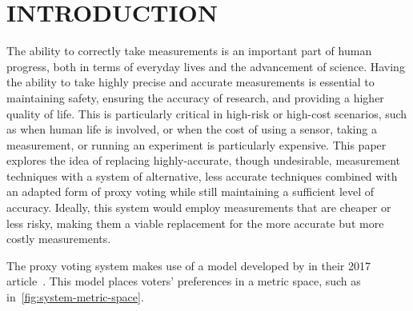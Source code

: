 %
%

\chapter{INTRODUCTION}\label{ch:introduction}
\thispagestyle{empty}

The ability to correctly take measurements is an important part of human
progress, both in terms of everyday lives and the advancement of science.
Having the ability to take highly precise and accurate measurements is essential
to maintaining safety, ensuring the accuracy of research, and providing a
higher quality of life.
This is particularly critical in high-risk or high-cost scenarios, such as when
human life is involved, or when the cost of using a sensor, taking a
measurement, or running an experiment is particularly expensive.
This paper explores the idea of replacing highly-accurate, though undesirable,
measurement techniques with a system of alternative, less accurate techniques combined
with an adapted form of proxy voting while still maintaining a sufficient level of
accuracy.
Ideally, this system would employ measurements that are cheaper or less risky, making
them a viable replacement for the more accurate but more costly measurements.

The proxy voting system makes use of a model developed by  in their 2017
article~\cite{Cohensius2017}.
This model places voters' preferences in a metric space, such as
in~\autoref{fig:system-metric-space}.

